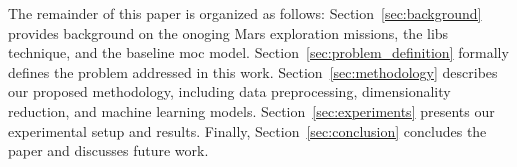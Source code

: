 The remainder of this paper is organized as follows:
Section~\ref{sec:background} provides background on the onoging Mars exploration missions, the \gls{libs} technique, and the baseline \gls{moc} model.
Section~\ref{sec:problem_definition} formally defines the problem addressed in this work.
Section~\ref{sec:methodology} describes our proposed methodology, including data preprocessing, dimensionality reduction, and machine learning models.
Section~\ref{sec:experiments} presents our experimental setup and results.
Finally, Section~\ref{sec:conclusion} concludes the paper and discusses future work.
